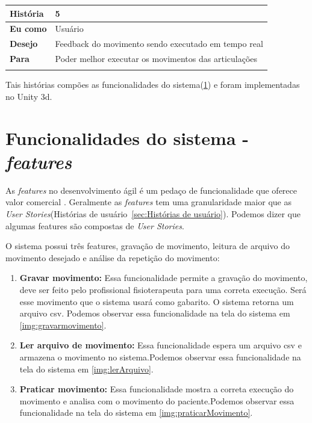 \begin{table}[H]
\begin{tabular}{|l|l|}
\textbf{História} & 5                                                        \\ \hline
\textbf{Eu como}  & Usuário                                                  \\ \hline
\textbf{Desejo}   & Feedback do movimento sendo executado em tempo real                    \\ \hline
\textbf{Para}     & Poder melhor executar os movimentos das articulações           \\ \hline
\multicolumn{2}{|l|}{}                                                       \\ \hline

\end{tabular}
\end{table}

  Tais histórias compões as funcionalidades do sistema(\ref{sub:features}) e foram implementadas no Unity 3d.


 \section{Funcionalidades do sistema - \textit{features}}\label{sub:features}
     As \textit{features} no desenvolvimento ágil é um pedaço de funcionalidade que oferece valor comercial \cite{versionOne}.
   Geralmente as \textit{features} tem uma granularidade maior que as \textit{User Stories}(Histórias de usuário~\ref{sec:Histórias de usuário}).
   Podemos dizer que algumas features são compostas de \textit{User Stories}.

     O sistema possui três features, gravação de movimento, leitura de arquivo do movimento desejado e análise da repetição do movimento:
   \begin{enumerate}
     \item \textbf{Gravar movimento:} Essa funcionalidade permite a gravação do movimento, deve ser feito pelo profissional fisioterapeuta
     para uma correta execução. Será esse movimento que o sistema usará como gabarito. O sistema retorna um arquivo csv. Podemos observar essa funcionalidade
     na tela do sistema em \ref{img:gravarmovimento}.

     \item \textbf{Ler arquivo de movimento:} Essa funcionalidade espera um arquivo csv e armazena o movimento no sistema.Podemos observar essa funcionalidade
     na tela do sistema em \ref{img:lerArquivo}.

     \item \textbf{Praticar movimento:} Essa funcionalidade mostra a correta execução do movimento e analisa com o movimento do paciente.Podemos observar essa funcionalidade
     na tela do sistema em \ref{img:praticarMovimento}.

   \end{enumerate}


